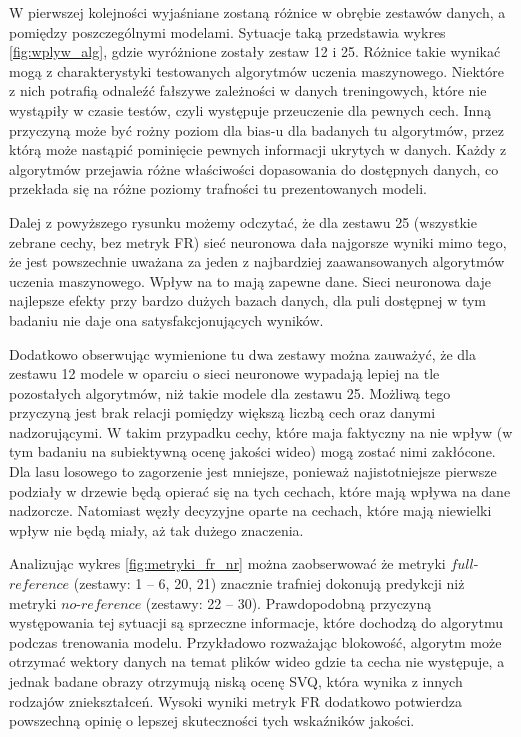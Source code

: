 W pierwszej kolejności wyjaśniane zostaną różnice w obrębie zestawów danych, a pomiędzy poszczególnymi modelami. Sytuacje taką przedstawia wykres \ref{fig:wplyw_alg}, gdzie wyróżnione zostały zestaw 12 i 25.  Różnice takie wynikać mogą z charakterystyki testowanych algorytmów uczenia maszynowego. Niektóre z nich potrafią odnaleźć fałszywe zależności w danych treningowych, które nie wystąpiły w czasie testów, czyli występuje  przeuczenie dla pewnych cech. Inną przyczyną może być rożny poziom dla bias-u dla badanych tu algorytmów, przez którą może nastąpić pominięcie pewnych informacji ukrytych w danych. Każdy z algorytmów przejawia różne właściwości dopasowania do dostępnych danych, co przekłada się na różne poziomy trafności tu prezentowanych modeli. 

Dalej z  powyższego rysunku możemy odczytać, że dla zestawu 25 (wszystkie zebrane cechy, bez metryk FR) sieć neuronowa dała najgorsze wyniki mimo tego, że jest powszechnie uważana za jeden z najbardziej zaawansowanych algorytmów uczenia maszynowego. Wpływ na to mają zapewne dane. Sieci neuronowa daje najlepsze efekty przy bardzo dużych bazach danych, dla puli dostępnej w tym badaniu nie daje ona satysfakcjonujących wyników.  

Dodatkowo obserwując wymienione tu dwa zestawy można zauważyć, że dla zestawu 12 modele w oparciu o sieci neuronowe wypadają lepiej na tle pozostałych algorytmów, niż takie modele dla zestawu 25. Możliwą tego przyczyną  jest brak relacji pomiędzy większą liczbą cech oraz danymi nadzorującymi. W takim przypadku cechy, które maja faktyczny na nie wpływ (w tym badaniu na subiektywną ocenę jakości wideo) mogą zostać nimi zakłócone. Dla lasu losowego to zagorzenie jest mniejsze, ponieważ najistotniejsze pierwsze podziały w drzewie będą opierać się na tych cechach, które mają wpływa na dane nadzorcze. Natomiast węzły decyzyjne oparte na cechach, które mają niewielki wpływ nie będą miały, aż tak dużego znaczenia. \par



Analizując wykres \ref{fig:metryki_fr_nr} można zaobserwować że metryki $full$-$reference$ (zestawy: 1 -- 6, 20, 21) znacznie trafniej dokonują predykcji niż metryki  $no$-$reference$ (zestawy: 22 -- 30). Prawdopodobną przyczyną występowania tej sytuacji są sprzeczne informacje, które dochodzą do algorytmu podczas  trenowania modelu. Przykładowo rozważając blokowość, algorytm może otrzymać wektory danych na temat plików wideo gdzie  ta cecha nie występuje, a jednak badane obrazy otrzymują niską ocenę SVQ, która wynika z innych rodzajów zniekształceń. Wysoki wyniki metryk FR dodatkowo potwierdza powszechną opinię o lepszej skuteczności tych wskaźników jakości.

